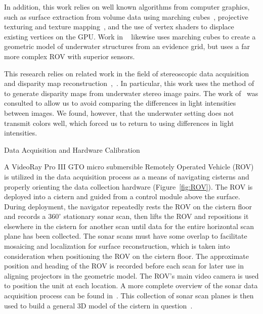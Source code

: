 \documentclass[twocolumn]{article}
\makeatletter
\def\section{\@startsection{section}{1}{\z@}{24pt plus 2 pt
minus 2 pt} {12pt plus 2pt minus 2pt}{\large\bf}}
\makeatother
\begin{document}
In addition, this work relies on well known algorithms from computer graphics, such as surface extraction from volume data using marching cubes~\cite{Lorensen}, projective texturing and texture mapping~\cite{Williams78castingcurved,Segal}, and the use of vertex shaders to displace existing vertices on the GPU. Work in ~\cite{Fairfield:2010} likewise uses marching cubes to create a geometric model of underwater structures from an evidence grid, but uses a far more complex ROV with superior sensors.

This research relies on related work in the field of stereoscopic data acquisition and disparity map reconstruction~\cite{stereo:gutMarroquin},~\cite{stereo:scharsteinSzeliski}.
In particular, this work uses the method of~\cite{stereo:zitKan} to generate disparity maps from underwater stereo image pairs.
The work of~\cite{stereo:nalGast} was consulted to allow us to avoid comparing the differences in light intensities between images.
We found, however, that the underwater setting does not transmit colors well, which forced us to return to using differences in light intensities.

\section{Data Acquisition and Hardware Calibration}
\label{sec:data}

A VideoRay Pro III GTO micro submersible Remotely Operated Vehicle (ROV) is utilized in the data acquisition process as a means of navigating cisterns and properly orienting the data collection hardware (Figure~\ref{fig:ROV}). The ROV is deployed into a cistern and guided from a control module above the surface. During deployment, the navigator repeatedly rests the ROV on the cistern floor and records a $360^{\circ}$ stationary sonar scan, then lifts the ROV and repositions it elsewhere in the cistern for another scan until data for the entire horizontal scan plane has been collected. The sonar scans must have some overlap to facilitate mosaicing and localization for surface reconstruction, which is taken into consideration when positioning the ROV on the cistern floor. The approximate position and heading of the ROV is recorded before each scan for later use in aligning projectors in the geometric model. The ROV's main video camera is used to position the unit at each location. A more complete overview of the sonar data acquisition process can be found in~\cite{ClarkVast}. This collection of sonar scan planes is then used to build a general 3D model of the cistern in question~\cite{ICEX11}.
\end{document}
